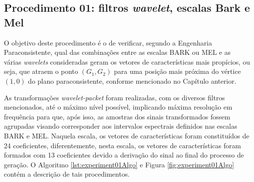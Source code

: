 		\subsection{Procedimento 01: filtros \textit{wavelet}, escalas Bark e Mel}
		\label{chap:propApproach:sec:Experimento01}
		\par O objetivo deste procedimento é o de verificar, segundo a Engenharia Paraconsistente, qual das combinações entre as escalas BARK ou MEL e as várias \textit{wavelets} consideradas geram os vetores de características mais propícios, ou seja, que atraem o ponto $(G_1,G_2)$ para uma posição mais próxima do vértice $(1,0)$ do plano paraconsistente, conforme mencionado no Capítulo anterior. 
				
		\par As transformações \textit{wavelet-packet} foram realizadas, com os diversos filtros mencionados, até  o máximo nível possível, implicando máxima resolução em frequência para que, após isso, as amostras dos sinais transformados fossem agrupadas visando corresponder aos intervalos espectrais definidos nas escalas BARK e MEL. Naquela escala, os vetores de características foram constituídos de 24 coeficientes, diferentemente, nesta escala, os vetores de características foram formados com 13 coeficientes devido a derivação do sinal ao final do processo de geração. O Algoritmo \ref{lst:experiment01Algo} e Figura \ref{fig:experiment01Algo} contém a descrição de tais procedimentos.

		
			
